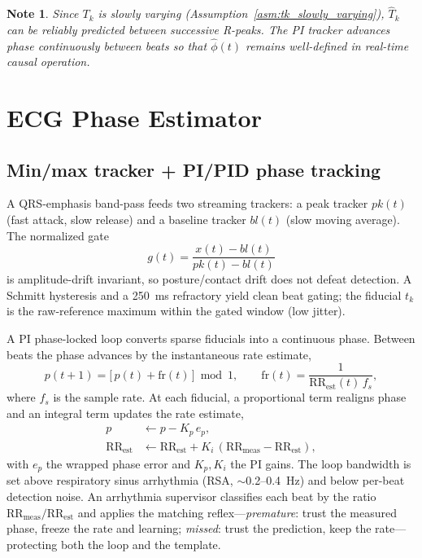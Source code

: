 \documentclass[11pt]{article}
\newtheorem{noteenv}{Note}
\begin{document}
\begin{noteenv}\label{note:pll_prediction}
Since $T_k$ is slowly varying (Assumption~\ref{asm:tk_slowly_varying}), $\hat{T}_k$ can be reliably
predicted between successive R-peaks. The PI tracker advances phase continuously between beats so
that $\hat{\phi}(t)$ remains well-defined in real-time causal operation.
\end{noteenv}


\section{ECG Phase Estimator}
\label{sec:ecg_phase_estimator}

\subsection{Min/max tracker + PI/PID phase tracking}

A QRS-emphasis band-pass feeds two streaming trackers: a peak tracker $pk(t)$ (fast attack, slow 
release) and a baseline tracker $bl(t)$ (slow moving average). The normalized gate
\begin{equation}
g(t) = \frac{x(t) - bl(t)}{pk(t) - bl(t)}
\label{eq:gate}
\end{equation}
is amplitude-drift invariant, so posture/contact drift does not defeat detection. A Schmitt 
hysteresis and a 250~ms refractory yield clean beat gating; the fiducial $t_k$ is the raw-reference 
maximum within the gated window (low jitter).

A PI phase-locked loop converts sparse fiducials into a continuous phase. Between beats the phase 
advances by the instantaneous rate estimate,
\begin{equation}
p(t+1) = \big[\, p(t) + \mathrm{fr}(t) \,\big] \bmod 1, \qquad \mathrm{fr}(t) = 
\frac{1}{\mathrm{RR}_{\mathrm{est}}(t)\, f_s},
\label{eq:phaseacc}
\end{equation}
where $f_s$ is the sample rate. At each fiducial, a proportional term realigns phase and an 
integral term updates the rate estimate,
\begin{align}
p &\leftarrow p - K_p \, e_p, \label{eq:pcorr}\\
\mathrm{RR}_{\mathrm{est}} &\leftarrow \mathrm{RR}_{\mathrm{est}} + K_i 
\,(\mathrm{RR}_{\mathrm{meas}} - \mathrm{RR}_{\mathrm{est}}), \label{eq:rcorr}
\end{align}
with $e_p$ the wrapped phase error and $K_p,K_i$ the PI gains. The loop bandwidth is set above 
respiratory sinus arrhythmia (RSA, $\sim$0.2--0.4~Hz) and below per-beat detection noise. An 
arrhythmia supervisor classifies each beat by the ratio 
$\mathrm{RR}_{\mathrm{meas}}/\mathrm{RR}_{\mathrm{est}}$ and applies the matching 
reflex---\emph{premature}: trust the measured phase, freeze the rate and learning; \emph{missed}: 
trust the prediction, keep the rate---protecting both the loop and the template.
\end{document}
